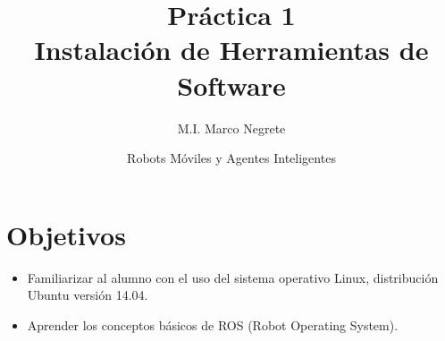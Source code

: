 \documentclass[letterpaper,12pt]{article}
\title{Práctica 1 \\ Instalación de Herramientas de Software}
\author{M.I. Marco Negrete}
\date{Robots Móviles y Agentes Inteligentes}
\begin{document}
\renewcommand{\tablename}{Tabla}
\maketitle

\section*{Objetivos}
\begin{itemize}
\item Familiarizar al alumno con el uso del sistema operativo Linux, distribución Ubuntu versión 14.04.
\item Aprender los conceptos básicos de ROS (Robot Operating System).
\end{itemize}
\end{document}
